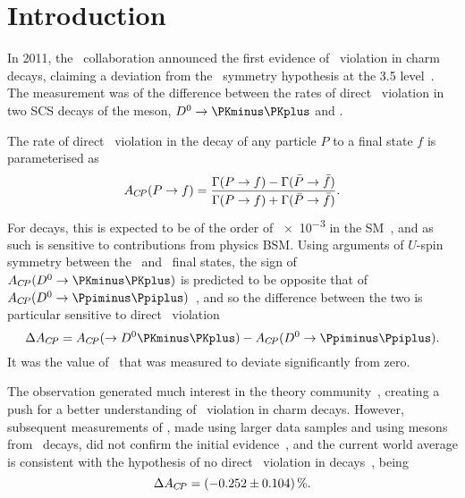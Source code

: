 \chapter{Introduction}
\label{chap:cpv:introduction}

In 2011, the \lhcb\ collaboration announced the first evidence of \CP\ 
violation in charm decays, claiming a deviation from the \CP\ symmetry 
hypothesis at the
\SI{3.5}{\sigma} level~\cite{Aaij:2011in}.
The measurement was of the difference between the rates of direct \CP\ 
violation in two \ac{SCS} decays of the \PDzero meson, $\decay{\PDzero}{\KmKp}$ 
and \pimpip.

The rate of direct \CP\ violation in the decay of any particle $P$ to a final 
state $f$ is parameterised as
\begin{equation}
  \ACP(\decay{P}{f}) = \frac{%
    \Gamma(\decay{P}{f}) - \Gamma(\decay{\bar{P}}{\bar{f}})
  }{%
    \Gamma(\decay{P}{f}) + \Gamma(\decay{\bar{P}}{\bar{f}})
  }.
  \label{eqn:cpv:introduction:acp}
\end{equation}
For \decay{\PDzero}{\hmhp} decays, this is expected to be of the order of 
\num{e-3} in the \ac{SM}~\cite{Grossman:2006jg}, and as such is sensitive to 
contributions from physics \acl{BSM}.
Using arguments of $U$-spin symmetry between the \KmKp\ and \pimpip\ final 
states, the sign of $\ACP(\decay{\PDzero}{\KmKp})$ is predicted to be opposite 
that of $\ACP(\decay{\PDzero}{\pimpip})$~\cite{Grossman:2006jg}, and so the 
difference between the two is particular sensitive to direct \CP\ violation
\begin{equation}
  \dACP = \ACP\decay({\PDzero}{\KmKp}) - \ACP(\decay{\PDzero}{\pimpip}).
  \label{eqn:cpv:introduction:dacp_pure}
\end{equation}
It was the value of \dACP\ that was measured to deviate significantly from 
zero.

The observation generated much interest in the theory 
community~\cite{Lenz:2013pwa}, creating a push for a better understanding of 
\CP\ violation in charm decays.
However, subsequent measurements of \dACP, made using larger data samples and 
using \PDzero mesons from \PB\ decays, did not confirm the initial 
evidence~\cite{Aaij:2014gsa,Aaij:2016cfh}, and the current world average is 
consistent with the hypothesis of no direct \CP\ violation in \PDzero 
decays~\cite{Amhis:2014hma}, being\footnotemark
\begin{equation}
  \dACP = \SI{-0.252 \pm 0.104}{\percent}.
  \label{eqn:cpv:introduction:dacp_world_average}
\end{equation}

